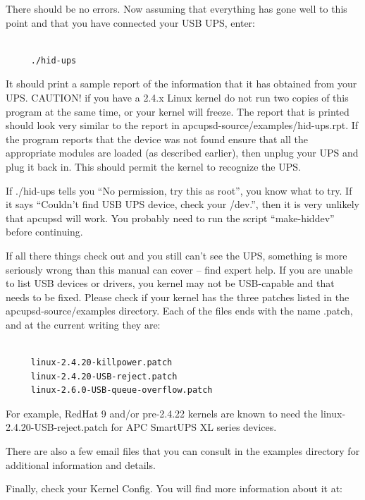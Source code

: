 There should be no errors. Now assuming that everything has gone well to this
point and that you have connected your USB UPS, enter:  

\label{index-hid_002dups-17}

\footnotesize
\begin{verbatim}
     
     ./hid-ups
\end{verbatim}
\normalsize

It should print a sample report of the information that it has obtained from
your UPS. CAUTION! if you have a 2.4.x Linux kernel do not run two copies of
this program at the same time, or your kernel will freeze. The report that is
printed should look very similar to the report in
\lt{}apcupsd-source\gt{}/examples/hid-ups.rpt. If the program reports that the
device was not found ensure that all the appropriate modules are loaded (as
described earlier), then unplug your UPS and plug it back in. This should
permit the kernel to recognize the UPS.  

If ./hid-ups tells you ``No permission, try this as root'', you know what to
try. If it says ``Couldn't find USB UPS device, check your /dev.'', then it is
very unlikely that apcupsd will work.  You probably need to run the script
``make-hiddev'' before continuing.  

If all there things check out and you still can't see the UPS, something is
more seriously wrong than this manual can cover {--} find expert help.  If you
are unable to list USB devices or drivers, you kernel may not be USB-capable
and that needs to be fixed. Please check if your kernel has the three patches
listed in the \lt{}apcupsd-source\gt{}/examples directory. Each of the files
ends with the name .patch, and at the current writing they are: 

\footnotesize
\begin{verbatim}
     
     linux-2.4.20-killpower.patch
     linux-2.4.20-USB-reject.patch
     linux-2.6.0-USB-queue-overflow.patch
\end{verbatim}
\normalsize

For example, RedHat 9 and/or pre-2.4.22 kernels are known to need the
linux-2.4.20-USB-reject.patch for APC SmartUPS XL series devices.  

There are also a few email files that you can consult in the examples
directory for additional information and details.  

Finally, check your Kernel Config. You will find more information about it at:

